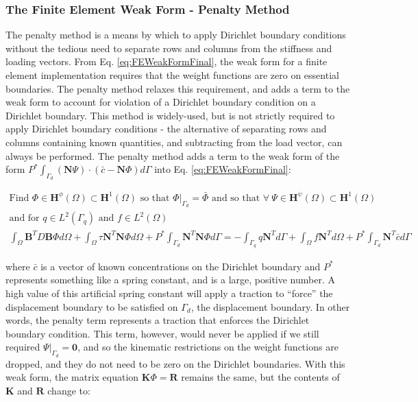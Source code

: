 \documentclass[10pt]{article}
\begin{document}
\subsubsection{The Finite Element Weak Form - Penalty Method}
\label{sec:Penalty}

The penalty method is a means by which to apply Dirichlet boundary conditions without the tedious need to separate rows and columns from the stiffness and loading vectors. From Eq. \eqref{eq:FEWeakFormFinal}, the weak form for a finite element implementation requires that the weight functions are zero on essential boundaries. The penalty method relaxes this requirement, and adds a term to the weak form to account for violation of a Dirichlet boundary condition on a Dirichlet boundary. This method is widely-used, but is not strictly required to apply Dirichlet boundary conditions - the alternative of separating rows and columns containing known quantities, and subtracting from the load vector, can always be performed. The penalty method adds a term to the weak form of the form \(P^{*}\int_{\Gamma_d}(\textbf{N}\Psi)\cdot(\bar{c}-\textbf{N}\Phi)d\Gamma\) into Eq. \eqref{eq:FEWeakFormFinal}:

\begin{tcolorbox}
\begin{equation}
\label{eq:WeakFormPenalty}
\begin{aligned}
\text{Find }\Phi\in \textbf{H}^\phi(\Omega)\subset \textbf{H}^1(\Omega) \text{ so that } \Phi|_{\Gamma_d}=\bar{\Phi} \text{ and so that }\forall\ \Psi \in \textbf{H}^\psi(\Omega)\subset \textbf{H}^1(\Omega)\\
\text{and for }q\in L^2(\Gamma_q)\text{ and }f\in L^2(\Omega)\\
\int_{\Omega}\textbf{B}^TD\textbf{B}\Phi d\Omega+\int_{\Omega}\tau \textbf{N}^T\textbf{N}\Phi d\Omega+P^{*}\int_{\Gamma_d}\textbf{N}^T\textbf{N}\Phi d\Gamma=-\int_{\Gamma_q}q\textbf{N}^Td\Gamma+\int_{\Omega}f\textbf{N}^Td\Omega+P^{*}\int_{\Gamma_d}\textbf{N}^T\bar{c}d\Gamma
\end{aligned}
\end{equation}
\end{tcolorbox}

where \(\bar{c}\) is a vector of known concentrations on the Dirichlet boundary and \(P^{*}\) represents something like a spring constant, and is a large, positive number. A high value of this artificial spring constant will apply a traction to ``force'' the displacement boundary to be satisfied on \(\Gamma_d\), the displacement boundary. In other words, the penalty term represents a traction that enforces the Dirichlet boundary condition. This term, however, would never be applied if we still required \(\Psi|_{\Gamma_d}=\textbf{0}\), and so the kinematic restrictions on the weight functions are dropped, and they do not need to be zero on the Dirichlet boundaries. With this weak form, the matrix equation \(\textbf{K}\Phi=\textbf{R}\) remains the same, but the contents of \(\textbf{K}\) and \(\textbf{R}\) change to:
\end{document}

